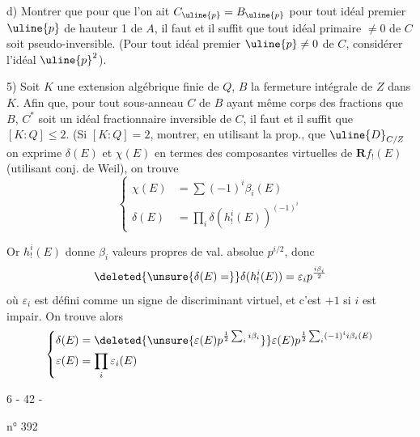 d) Montrer que pour que l'on ait $C_{\uline{p}}=B_{\uline{p}}$ pour tout idéal premier $\uline{p}$ de hauteur 1 de $A$, il faut et il suffit que tout idéal primaire $\neq0$ de $C$ soit pseudo-inversible. (Pour tout idéal premier $\uline{p}\neq0$ de $C$, considérer l'idéal $\uline{p}^2$).

5) Soit $K$ une extension algébrique finie de $Q$, $B$ la fermeture intégrale de $Z$ dans $K$. Afin que, pour tout sous-anneau $C$ de $B$ ayant même corps des fractions que $B$, $C^*$ soit un idéal fractionnaire inversible de $C$, il faut et il suffit que $[K:Q]\leq2$. (Si $[K:Q]=2$, montrer, en utilisant la prop.\quad, que $\uline{D}_{C/Z}$
 on exprime $\delta(E)$ et $\chi(E)$ en termes des  composantes virtuelles de $\mathbf R f_!(E)$ (utilisant conj. de Weil), on trouve
\[
\left\{\begin{aligned}
\chi(E)&=\sum(-1)^i\beta_i(E)\\
\delta(E)&=\prod_i\delta(h_!^i(E))^{(-1)^i}
\end{aligned}\right.
\]

Or $h_!^i(E)$ donne $\beta_i$ valeurs propres de val. absolue $p^{i/2}$, donc
\[\deleted{\unsure{\delta(E)=}}\delta(h_!^i(E))=\varepsilon_i p^{\frac{i\beta_i}{2}}\]
où \deleted{$\unsure{\delta}$} $\varepsilon_i$ est défini comme un signe de discriminant virtuel, et c'est \deleted{$\unsure{\varepsilon}$} $+1$ si $i$ est impair. On trouve alors
\[
\left\{\begin{aligned}
\delta(E)&=\deleted{\unsure{\varepsilon(E)p^{\frac12\sum_i i\beta_i}}}\varepsilon(E)p^{\frac12\sum_i(-1)^i i\beta_i(E)}\\
\varepsilon(E)&=\prod_i\varepsilon_i(E)
\end{aligned}\right.
\]
\begin{center}6 - 42 -\end{center}
\hfill n° 392

